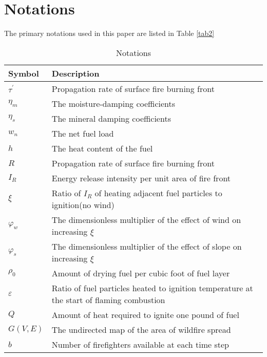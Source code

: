 \documentclass[12pt]{article}  %
\begin{document}
\section{Notations}
The primary notations used in this paper are listed in Table \ref{tab2}
\begin{table}[htbp]
	\begin{center}
		\caption{Notations}
		\begin{tabular}{m{1.5cm} m{12.1cm}}
			\toprule[2pt]
			\multicolumn{1}{m{2.7cm}}{\centering Symbol}
			&\multicolumn{1}{m{12cm}}{\centering Description }\\
			\midrule
			$\tau^{\prime}$& Propagation rate of surface fire burning front \\
		\vspace{2pt}
		$\eta_m$& The moisture-damping coefficients \\
		\vspace{2pt}
		$\eta_s$& The mineral damping coefficients \\
		\vspace{2pt}
		$w_n$& The net fuel load \\
		\vspace{2pt}
		$h$& The heat content of the fuel \\
		\vspace{2pt}
		$R$& Propagation rate of surface fire burning front \\
		\vspace{2pt}
		$I_R$& Energy release intensity per unit area of fire front \\
		\vspace{2pt}
		$\xi$& Ratio of $I_R$ of heating adjacent fuel particles to ignition(no wind)\\
		\vspace{2pt}
		$\varphi_w$& The dimensionless multiplier of the effect of wind on increasing $\xi$ \\
		\vspace{2pt}
		$\varphi_s$ & The dimensionless multiplier of the effect of slope on increasing $\xi$\\
		\vspace{2pt}
		$\rho_0$ & Amount of drying fuel per cubic foot of fuel layer\\
		\vspace{3pt}
		$\varepsilon$ & Ratio of fuel particles heated to ignition temperature at the start of flaming combustion\\
		\vspace{3pt}
		$Q$ & Amount of heat required to ignite one pound of fuel\\
		\vspace{3pt}
		$G(V,E)$& The undirected map of the area of wildfire spread \\
		\vspace{2pt}			
		$b$& Number of firefighters available at each time step \\
			

\end{tabular}
\end{center}
\end{table}
\end{document}
